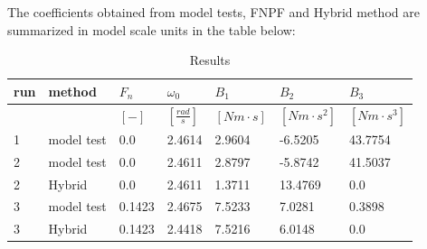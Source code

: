     The coefficients obtained from model tests, FNPF and Hybrid method are
summarized in model scale units in the table below:
 
            
    
    
\begin{table}[H]
\scriptsize
\center
\caption{Results}
\label{tab:results}
\begin{tabular}{lllllll}
\toprule\addlinespace
run & method & $F_n$ & $\omega_0$ & $B_1$ & $B_2$ & $B_3$\\ 
\midrule &  & $[-]$ & $\left[\frac{rad}{s}\right]$ & $[Nm \cdot s]$ & $[Nm \cdot s^2]$ & $[Nm \cdot s^3]$\\ 
1 & model test & 0.0 & 2.4614 & 2.9604 & -6.5205 & 43.7754\\ 
2 & model test & 0.0 & 2.4611 & 2.8797 & -5.8742 & 41.5037\\ 
2 & Hybrid & 0.0 & 2.4611 & 1.3711 & 13.4769 & 0.0\\ 
3 & model test & 0.1423 & 2.4675 & 7.5233 & 7.0281 & 0.3898\\ 
3 & Hybrid & 0.1423 & 2.4418 & 7.5216 & 6.0148 & 0.0\\ 

\bottomrule
\end{tabular}
\end{table}

    

    